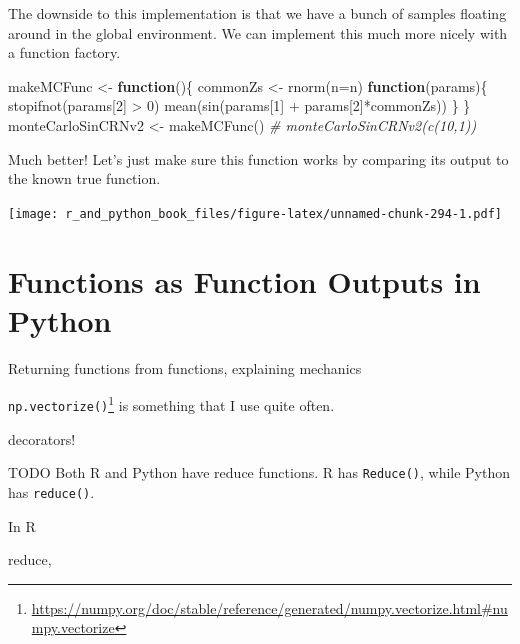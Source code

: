 \documentclass[
  12pt,
  krantz2]{krantz}
\makeatletter
\newenvironment{Shaded}{\begin{snugshade}}{\end{snugshade}}
\newcommand{\AttributeTok}[1]{\textcolor[rgb]{0.61,0.61,0.61}{#1}}
\newcommand{\CommentTok}[1]{\textcolor[rgb]{0.37,0.37,0.37}{\textit{#1}}}
\newcommand{\ControlFlowTok}[1]{\textcolor[rgb]{0.27,0.27,0.27}{\textbf{#1}}}
\newcommand{\DecValTok}[1]{\textcolor[rgb]{0.06,0.06,0.06}{#1}}
\newcommand{\FunctionTok}[1]{\textcolor[rgb]{0,0,0}{#1}}
\newcommand{\NormalTok}[1]{#1}
\newcommand{\OtherTok}[1]{\textcolor[rgb]{0.37,0.37,0.37}{#1}}
\newcommand{\SpecialCharTok}[1]{\textcolor[rgb]{0,0,0}{#1}}
\renewcommand{\href}[2]{#2\footnote{\url{#1}}}
\newenvironment{kframe}{%
\medskip{}
\setlength{\fboxsep}{.8em}
 \def\at@end@of@kframe{}%
 \ifinner\ifhmode%
  \def\at@end@of@kframe{\end{minipage}}%
  \begin{minipage}{\columnwidth}%
 \fi\fi%
 \def\FrameCommand##1{\hskip\@totalleftmargin \hskip-\fboxsep
 \colorbox{shadecolor}{##1}\hskip-\fboxsep
     \hskip-\linewidth \hskip-\@totalleftmargin \hskip\columnwidth}%
 \MakeFramed {\advance\hsize-\width
   \@totalleftmargin\z@ \linewidth\hsize
   \@setminipage}}%
 {\par\unskip\endMakeFramed%
 \at@end@of@kframe}
\renewenvironment{Shaded}{\begin{kframe}}{\end{kframe}}
\makeatother
\begin{document}
The downside to this implementation is that we have a bunch of samples floating around in the global environment. We can implement this much more nicely with a function factory.

\begin{Shaded}
\begin{Highlighting}[]
\NormalTok{makeMCFunc }\OtherTok{\textless{}{-}} \ControlFlowTok{function}\NormalTok{()\{}
\NormalTok{  commonZs }\OtherTok{\textless{}{-}} \FunctionTok{rnorm}\NormalTok{(}\AttributeTok{n=}\NormalTok{n)}
  \ControlFlowTok{function}\NormalTok{(params)\{}
    \FunctionTok{stopifnot}\NormalTok{(params[}\DecValTok{2}\NormalTok{] }\SpecialCharTok{\textgreater{}} \DecValTok{0}\NormalTok{) }
    \FunctionTok{mean}\NormalTok{(}\FunctionTok{sin}\NormalTok{(params[}\DecValTok{1}\NormalTok{] }\SpecialCharTok{+}\NormalTok{ params[}\DecValTok{2}\NormalTok{]}\SpecialCharTok{*}\NormalTok{commonZs))    }
\NormalTok{  \}  }
\NormalTok{\}}
\NormalTok{monteCarloSinCRNv2 }\OtherTok{\textless{}{-}} \FunctionTok{makeMCFunc}\NormalTok{()}
\CommentTok{\# monteCarloSinCRNv2(c(10,1))}
\end{Highlighting}
\end{Shaded}

Much better! Let's just make sure this function works by comparing its output to the known true function.

\texttt{[image: r\_and\_python\_book\_files/figure-latex/unnamed-chunk-294-1.pdf]}

\hypertarget{functions-as-function-outputs-in-python}{%
\section{Functions as Function Outputs in Python}\label{functions-as-function-outputs-in-python}}

Returning functions from functions, explaining mechanics

\href{https://numpy.org/doc/stable/reference/generated/numpy.vectorize.html\#numpy.vectorize}{\texttt{np.vectorize()}} is something that I use quite often.

decorators!

TODO Both R and Python have reduce functions. R has \texttt{Reduce()}, while Python has \texttt{reduce()}.

In R

reduce,

  

\backmatter
\printindex
\end{document}
